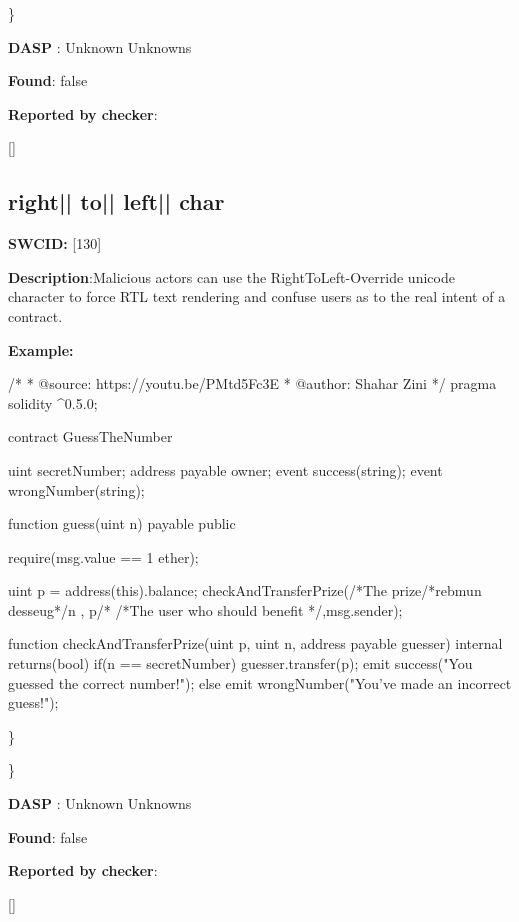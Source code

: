 \documentclass{article}
\begin{document}
\} 

\textbf{DASP} : Unknown Unknowns

\textbf{Found}: false

\textbf{Reported by checker}: 
\begin{ffcode} 

[]
\end{ffcode} 
\subsection{right{|\textunderscore| }to{|\textunderscore| }left{|\textunderscore| }char} 
\textbf{SWC{\textunderscore }ID:} [130]

\textbf{Description}:Malicious actors can use the Right{\textendash}To{\textendash}Left-Override unicode character to force RTL text rendering and confuse users as to the real intent of a contract.


\textbf{Example:} 
\begin{ffcode} 

/*
* @source: https://youtu.be/P\textunderscore Mtd5Fc\textunderscore 3E
* @author: Shahar Zini
*/
pragma solidity ^0.5.0;

contract GuessTheNumber
{
    uint \textunderscore secretNumber;
    address payable \textunderscore owner;
    event success(string);
event wrongNumber(string);

    function guess(uint n) payable public
    {
        require(msg.value == 1 ether);

        uint p = address(this).balance;
        checkAndTransferPrize(/*The prize/*rebmun desseug*/n , p/*
                /*The user who should benefit */,msg.sender);
    }

    function checkAndTransferPrize(uint p, uint n, address payable guesser) internal returns(bool)
    {
        if(n == \textunderscore secretNumber)
        {
            guesser.transfer(p);
            emit success("You guessed the correct number!");
        }
        else
        {
            emit wrongNumber("You've made an incorrect guess!");
        }
    }
  }

\end{ffcode} 
\} 

\} 

\textbf{DASP} : Unknown Unknowns

\textbf{Found}: false

\textbf{Reported by checker}: 
\begin{ffcode} 

[]
\end{ffcode} 
\end{document}
